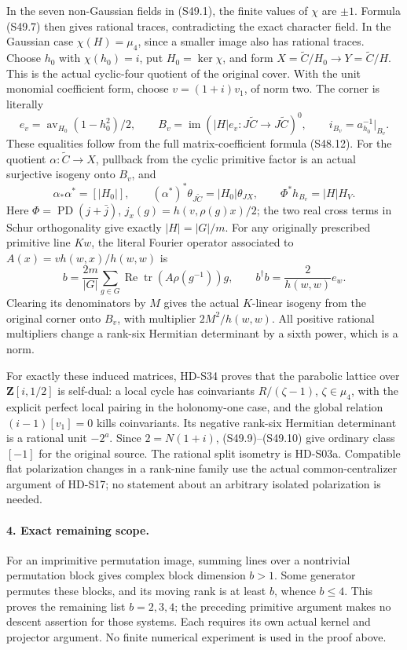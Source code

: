 In the seven non-Gaussian fields in (S49.1), the finite values
of \(\chi\) are \(\pm1\). Formula (S49.7) then gives
rational traces, contradicting the exact character field.
In the Gaussian case \(\chi(H)=\mu_4\), since a smaller
image also has rational traces. Choose \(h_0\) with
\(\chi(h_0)=i\), put \(H_0=\ker\chi\), and form
\(X=\widetilde C/H_0\to Y=\widetilde C/H\).
This is the actual cyclic-four quotient of the original
cover. With the unit monomial coefficient form, choose
\(v=(1+i)v_1\), of norm two. The corner is literally
\[
 e_v=\operatorname{av}_{H_0}(1-h_0^2)/2,\qquad
 B_v=\operatorname{im}(|H|e_v:J\widetilde C\to
 J\widetilde C)^0,\qquad i_{B_v}=a_{h_0}^{-1}|_{B_v}.
                                                               \tag{S49.8}
\]
These equalities follow from the full matrix-coefficient
formula (S48.12). For the quotient \(\alpha:\widetilde
C\to X\), pullback from the cyclic primitive factor is an
actual surjective isogeny onto \(B_v\), and
\[
 \alpha_*\alpha^*=[|H_0|],\qquad
 (\alpha^*)^*\theta_{J\widetilde C}=|H_0|\theta_{JX},
 \qquad \Phi^*h_{B_v}=|H|H_V.                               \tag{S49.9}
\]
Here \(\Phi=\operatorname{PD}(j+\bar j)\),
\(j_x(g)=h(v,\rho(g)x)/2\); the two real cross terms
in Schur orthogonality give exactly \(|H|=|G|/m\).
For any originally prescribed primitive line \(Kw\), the
literal Fourier operator associated to
\(A(x)=v h(w,x)/h(w,w)\) is
\[
 b=\frac{2m}{|G|}\sum_{g\in G}
       \operatorname{Re}\operatorname{tr}(A\rho(g^{-1}))g,
 \qquad b^\dagger b=\frac2{h(w,w)}e_w.                     \tag{S49.10}
\]
Clearing its denominators by \(M\) gives the actual
\(K\)-linear isogeny from the original corner onto \(B_v\),
with multiplier \(2M^2/h(w,w)\). All positive rational
multipliers change a rank-six Hermitian determinant by a
sixth power, which is a norm.

For exactly these induced matrices, HD-S34 proves that the
parabolic lattice over \(\mathbf Z[i,1/2]\) is self-dual:
a local cycle has coinvariants \(R/(\zeta-1)\),
\(\zeta\in\mu_4\), with the explicit perfect local
pairing in the holonomy-one case, and the global relation
\((i-1)[v_1]=0\) kills coinvariants. Its negative rank-six
Hermitian determinant is a rational unit \(-2^a\).
Since \(2=N(1+i)\), (S49.9)--(S49.10) give ordinary
class \([-1]\) for the original source. The rational split
isometry is HD-S03a. Compatible flat polarization changes in
a rank-nine family use the actual common-centralizer argument
of HD-S17; no statement about an arbitrary isolated
polarization is needed.

\paragraph{4. Exact remaining scope.}
For an imprimitive permutation image, summing lines over a
nontrivial permutation block gives complex block dimension
\(b>1\). Some generator permutes these blocks, and its
moving rank is at least \(b\), whence \(b\le4\).
This proves the remaining list \(b=2,3,4\); the preceding
primitive argument makes no descent assertion for those
systems. Each requires its own actual kernel and projector
argument. No finite numerical experiment is used in the
proof above.
